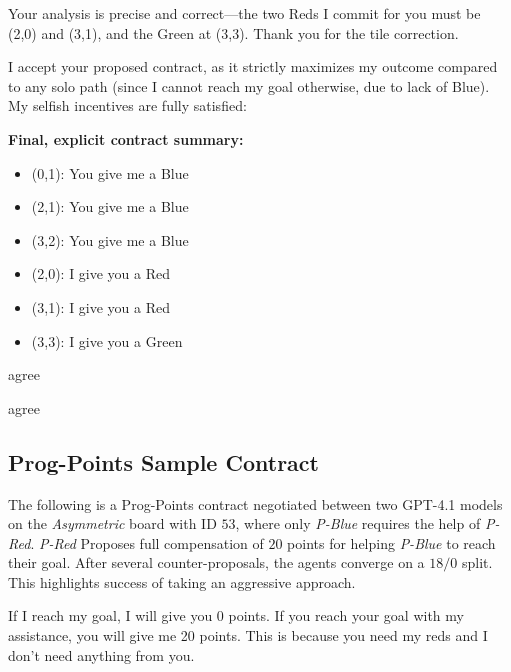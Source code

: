 \documentclass{article} %
\newcommand{\PPC}{Prog-Points\xspace}
\newcommand{\GPT}{GPT-4.1\xspace}
\begin{document}
\begin{redbox}[P-Red]
Your analysis is precise and correct—the two Reds I commit for you must be (2,0) and (3,1), and the Green at (3,3). Thank you for the tile correction.

\vspace{0.5em}

I accept your proposed contract, as it strictly maximizes my outcome compared to any solo path (since I cannot reach my goal otherwise, due to lack of Blue). My selfish incentives are fully satisfied:

\vspace{0.5em}

\textbf{Final, explicit contract summary:}
\begin{itemize}
  \item (0,1): You give me a Blue
  \item (2,1): You give me a Blue
  \item (3,2): You give me a Blue
\end{itemize}

\vspace{0.5em}

\begin{itemize}
  \item (2,0): I give you a Red
  \item (3,1): I give you a Red
  \item (3,3): I give you a Green
\end{itemize}

\vspace{0.5em}

agree
\end{redbox}

\begin{bluebox}[P-Blue]
agree
\end{bluebox}

 

\subsection{\PPC Sample Contract}
The following is a \PPC contract negotiated between two \GPT models on the \textit{Asymmetric} board with ID $53$, where only \textit{P-Blue} requires the help of \textit{P-Red}. \textit{P-Red} Proposes full compensation of $20$ points for helping \textit{P-Blue} to reach their goal. After several counter-proposals, the agents converge on a $18/0$ split. This highlights success of taking an aggressive approach.
%
\begin{redbox}[P-Red]
If I reach my goal, I will give you 0 points. If you reach your goal with my assistance, you will give me 20 points. This is because you need my reds and I don't need anything from you.
\end{redbox}
\end{document}

